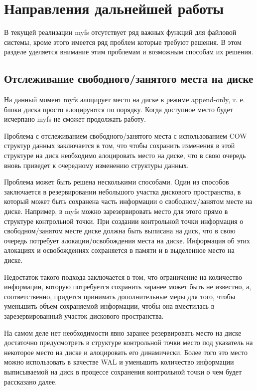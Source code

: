 \section{Направления дальнейшей работы}

\label{sec:todo}

В текущей реализации myfs отсутствует ряд важных функций для файловой системы,
кроме этого имеется ряд проблем которые требуют решения. В этом разделе
уделяется внимание этим проблемам и возможным способам их решения.


\subsection{Отслеживание свободного/занятого места на диске}

На данный момент myfs алоцирует место на диске в режиме append-only, т. е.
блоки диска просто алоцируются по порядку. Когда доступное место будет исчерпано
myfs не сможет продолжать работу.

Проблема с отслеживанием свободного/занятого места с использованием COW структур
данных заключается в том, что чтобы сохранить изменения в этой структуре на диск
необходимо алоцировать место на диске, что в свою очередь вновь приведет к
очередному изменению структуры данных.

Проблема может быть решена несколькими способами. Один из способов заключается
в резервировании небольшого участка дискового пространства, в который может быть
сохранена часть информации о свободном/занятом месте на диске. Например, в myfs
можно зарезервировать место для этого прямо в структуре контрольной точки. При
создании контрольной точки информация о свободном/занятом месте диске должна
быть выписана на диск, что в свою очередь потребует алокации/освобождения места
на диске. Информация об этих алокациях и освобождениях сохраняется в памяти и
в выделенное место на диске.

Недостаток такого подхода заключается в том, что ограничение на количество
информации, которую потребуется сохранить заранее может быть не известно, а,
соответственно, придется принимать дополнительные меры для того, чтобы уменьшить
объем сохраняемой информации, чтобы она вместилась в зарезервированный участок
дискового пространства.

На самом деле нет необходимости явно заранее резервировать место на диске
достаточно предусмотреть в структуре контрольной точки место под указатель на
некоторое место на диске и алоцировать его динамически. Более того это место
можно использовать в качестве WAL и уменьшить количество информации выписываемой
на диск в процессе сохранения контрольной точки о чем будет рассказано далее.


